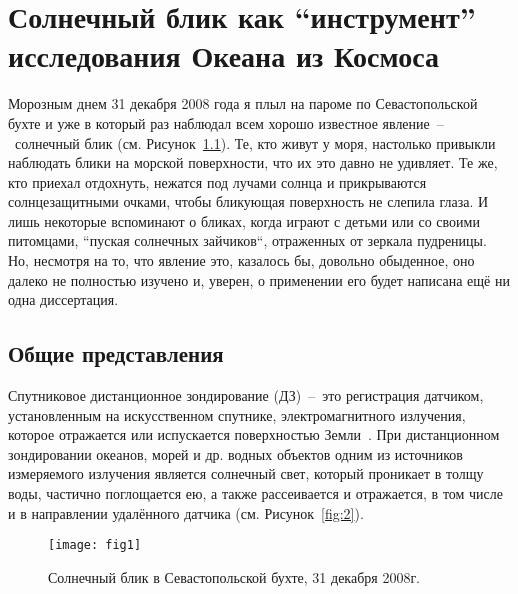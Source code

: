 \chapter{Солнечный блик как ``инструмент'' исследования Океана из Космоса} \label{chap:1}

Морозным днем 31 декабря 2008 года я плыл на пароме по Севастопольской бухте и уже в который раз наблюдал всем хорошо известное явление~--~солнечный блик (см. Рисунок~\ref{fig:1}). Те, кто живут у моря, настолько привыкли наблюдать блики на морской поверхности, что их это давно не удивляет. Те же, кто приехал отдохнуть, нежатся под лучами солнца и прикрываются солнцезащитными очками, чтобы бликующая поверхность не слепила глаза. И лишь некоторые вспоминают о бликах, когда играют с детьми или со своими питомцами, ``пуская солнечных зайчиков``, отраженных от зеркала пудреницы. Но, несмотря на то, что явление это, казалось бы, довольно обыденное, оно далеко не полностью изучено и, уверен, о применении его будет написана ещё ни одна диссертация. 



\section{Общие представления} \label{sec:1.1}


Спутниковое дистанционное зондирование (ДЗ)~--~это регистрация датчиком, установленным на искусственном спутнике, электромагнитного излучения, которое отражается или испускается поверхностью Земли~\citep{Robinson2004}. При дистанционном зондировании океанов, морей и др. водных объектов одним из источников измеряемого излучения является солнечный свет, который проникает в толщу воды, частично поглощается ею, а также рассеивается и отражается, в том числе и в направлении удалённого датчика (см. Рисунок~\ref{fig:2}).



\begin{figure}[!thb]
 \center
 \texttt{[image: fig1]}
 \caption{Солнечный блик в Севастопольской бухте, 31 декабря 2008г.}
 \label{fig:1}
\end{figure}

